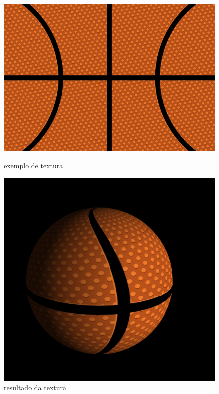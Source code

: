 \documentclass[a4paper]{report}
\begin{document}


\begin{figure}[H]
    \centering
    \begin{minipage}{0.50\textwidth}
        \centering
        \includegraphics[width=\textwidth]{images/basketball.png}
        \caption{exemplo de textura}
    \end{minipage}\hfill
    \begin{minipage}{0.49\textwidth}
        \centering
        \includegraphics[width=\textwidth]{images/basket_rendered.png}
        \caption{resultado da textura}
    \end{minipage}\hfill
\end{figure}
\end{document}
